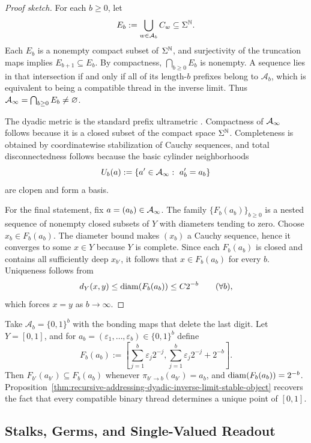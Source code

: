 \begin{proof}[Proof sketch]
For each $b\ge 0$, let
\[
E_b
:=
\bigcup_{w\in \mathcal{A}_b} C_w
\subseteq \Sigma^{\mathbb{N}}.
\]
Each $E_b$ is a nonempty compact subset of $\Sigma^{\mathbb{N}}$, and surjectivity of
the truncation maps implies $E_{b+1}\subseteq E_b$.  By compactness,
$\bigcap_{b\ge 0}E_b$ is nonempty.  A sequence lies in that intersection if and
only if all of its length-$b$ prefixes belong to $\mathcal{A}_b$, which is
equivalent to being a compatible thread in the inverse limit.  Thus
$\mathcal{A}_{\infty}=\bigcap_{b\ge 0}E_b\neq\varnothing$.

The dyadic metric is the standard prefix ultrametric
\cite[\S 2.1]{RibesZalesskii2010ProfiniteGroups}.
Compactness of $\mathcal{A}_{\infty}$ follows because it is a closed subset of the compact
space $\Sigma^{\mathbb{N}}$.  Completeness is obtained by coordinatewise stabilization
of Cauchy sequences, and total disconnectedness follows because the basic
cylinder neighborhoods
\[
U_b(a):=\{a'\in\mathcal{A}_{\infty}:\ a'_b=a_b\}
\]
are clopen and form a basis.

For the final statement, fix $a=(a_b)\in\mathcal{A}_{\infty}$.  The family
$\{F_b(a_b)\}_{b\ge 0}$ is a nested sequence of nonempty closed subsets of $Y$
with diameters tending to zero.  Choose $x_b\in F_b(a_b)$.  The diameter bound
makes $(x_b)$ a Cauchy sequence, hence it converges to some $x\in Y$ because
$Y$ is complete.  Since each $F_b(a_b)$ is closed and contains all sufficiently
deep $x_{b'}$, it follows that $x\in F_b(a_b)$ for every $b$.  Uniqueness
follows from
\[
d_Y(x,y)\le \operatorname{diam}(F_b(a_b))\le C2^{-b}
\qquad
(\forall b),
\]
which forces $x=y$ as $b\to\infty$.
\end{proof}

\begin{example}
\label{ex:dyadic-intervals}
Take $\mathcal{A}_b=\{0,1\}^b$ with the bonding maps that delete the last
digit.  Let $Y=[0,1]$, and for
$a_b=(\varepsilon_1,\dots,\varepsilon_b)\in\{0,1\}^b$ define
\[
F_b(a_b):=
\left[
\sum_{j=1}^b \varepsilon_j2^{-j},
\sum_{j=1}^b \varepsilon_j2^{-j}+2^{-b}
\right].
\]
Then $F_{b'}(a_{b'})\subseteq F_b(a_b)$ whenever
$\pi_{b'\to b}(a_{b'})=a_b$, and
$\operatorname{diam}(F_b(a_b))=2^{-b}$.
Proposition~\ref{thm:recursive-addressing-dyadic-inverse-limit-stable-object}
recovers the fact that every compatible binary thread determines a unique point
of $[0,1]$.
\end{example}

\subsection{Stalks, Germs, and Single-Valued Readout}

